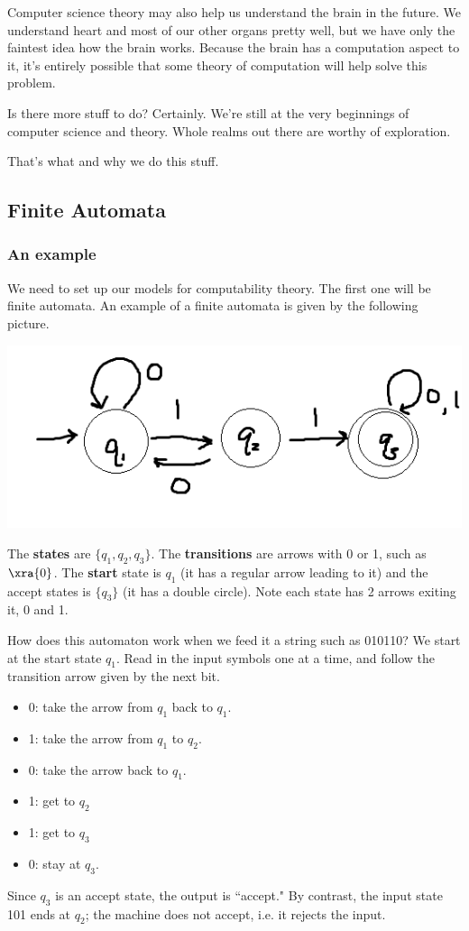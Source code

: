 Computer science theory may also help us understand the brain in the future. We understand heart and most of our other organs pretty well, but we have only the faintest idea how the brain works. Because the brain has a computation aspect to it, it's entirely possible that some theory of computation will help solve this problem.

Is there more stuff to do? Certainly. We're still at the very beginnings of computer science and theory. Whole realms out there are worthy of exploration.

That's what and why we do this stuff.
\subsection{Finite Automata}
\subsubsection{An example}
We need to set up our models for computability theory. The first one will be finite automata. An example of a finite automata is given by the following picture.

\begin{center}
\includegraphics{1-1}
\end{center}

The \textbf{states} are $\{q_1,q_2,q_3\}$. The \textbf{transitions} are arrows with 0 or 1, such as $\xra{0}$. The \textbf{start} state is $q_1$ (it has a regular arrow leading to it) and the accept states is $\{q_3\}$ (it has a double circle). Note each state has 2 arrows exiting it, 0 and 1.

How does this automaton work when we feed it a string such as 010110? We start at the start state $q_1$. Read in the input symbols one at a time, and follow the transition arrow given by the next bit. 
\begin{itemize}
\item
0: take the arrow from $q_1$ back to $q_1$.
\item
1: take the arrow from $q_1$ to $q_2$.
\item
0: take the arrow back to $q_1$.
\item
1: get to $q_2$
\item 
1: get to $q_3$
\item 
0: stay at $q_3$.
\end{itemize}
Since $q_3$ is an accept state, the output is ``accept." By contrast, the input state 101 ends at $q_2$; the machine does not accept, i.e. it rejects the input.\\

